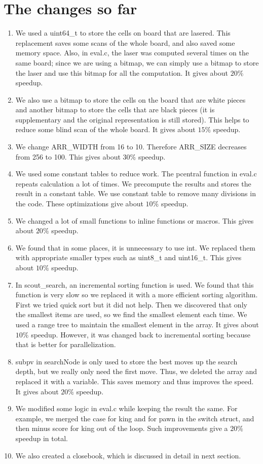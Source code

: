 \documentclass[10pt,twosidep]{article}
\begin{document}
\section{The changes so far}
\begin{enumerate}
  \item We used a uint64\_t to store the cells on board that are lasered. This replacement saves some scans of the whole board, and also saved some memory space. Also, in eval.c, the laser was computed several times on the same board; since we are using a bitmap, we can simply use a bitmap to store the laser and use this bitmap for all the computation. It gives about $20\%$ speedup.
  \item We also use a bitmap to store the cells on the board that are white pieces and another bitmap to store the cells that are black pieces (it is supplementary and the original representation is still stored). This helps to reduce some blind scan of the whole board.  It gives about $15\%$ speedup.
  \item We change ARR\_WIDTH from 16 to 10. Therefore ARR\_SIZE decreases from 256 to 100. This gives about $30\%$ speedup.
  \item We used some constant tables to reduce work. 
  The pcentral function in eval.c repeats calculation a lot of times. We precompute the results and stores the result in a constant table.
  We use constant table to remove many divisions in the code.
  These optimizations give about $10\%$ speedup.
  \item We changed a lot of small functions to inline functions or macros. This gives about $20\%$ speedup.
  \item We found that in some places, it is unnecessary to use int. We replaced them with appropriate smaller types such as uint8\_t and uint16\_t. This gives about $10\%$ speedup.
  \item In scout\_search, an incremental sorting function is used. We found that this function is very slow so we replaced it with a more efficient sorting algorithm. First we tried quick sort but it did not help. Then we discovered that only the smallest items are used, so we find the smallest element each time. We used a range tree to maintain the smallest element in the array. It gives about $10\%$ speedup. However, it was changed back to incremental sorting because that is better for parallelization. 
  \item subpv in searchNode is only used to store the best moves up the search depth, but we really only need the first move. Thus, we deleted the array and replaced it with a variable. This saves memory and thus improves the speed. It gives about $20\%$ speedup.
  \item We modified some logic in eval.c while keeping the result the same. For example, we merged the case for king and for pawn in the switch struct, and then minus score for king out of the loop. Such improvements give a $20\%$ speedup in total.
  \item We also created a closebook, which is discussed in detail in next section.
  

\end{enumerate}
\end{document}
